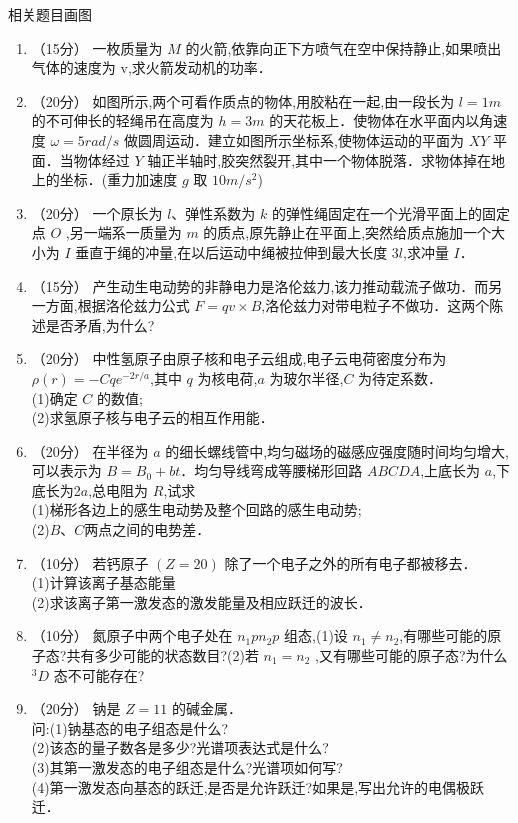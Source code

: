 
\begin{issues}
\issueTODO
相关题目画图
\end{issues}


\begin{enumerate}
\item （15分）
一枚质量为 $M$ 的火箭,依靠向正下方喷气在空中保持静止,如果喷出气体的速度为 $\mathrm v$,求火箭发动机的功率．
\item （20分）
如图所示,两个可看作质点的物体,用胶粘在一起,由一段长为 $l=1m$ 的不可伸长的轻绳吊在高度为 $h=3m$ 的天花板上．使物体在水平面内以角速度 $\omega=5rad/s$ 做圆周运动．建立如图所示坐标系,使物体运动的平面为 $XY$ 平面．当物体经过 $Y$ 轴正半轴时,胶突然裂开,其中一个物体脱落．求物体掉在地上的坐标．(重力加速度 $g$ 取 $10m/s^2$)
\item （20分）
一个原长为 $l$、弹性系数为 $k$ 的弹性绳固定在一个光滑平面上的固定点 $O$ ,另一端系一质量为 $m$ 的质点,原先静止在平面上,突然给质点施加一个大小为 $I$ 垂直于绳的冲量,在以后运动中绳被拉伸到最大长度 3$l$,求冲量 $I$．
\item （15分）
产生动生电动势的非静电力是洛伦兹力,该力推动载流子做功．而另一方面,根据洛伦兹力公式 $F=qv\times B$,洛伦兹力对带电粒子不做功．这两个陈述是否矛盾,为什么?
\item （20分）
中性氢原子由原子核和电子云组成,电子云电荷密度分布为 $\rho(r)=-Cqe^{-2r/a}$,其中 $q$ 为核电荷,$a$ 为玻尔半径,$C$ 为待定系数．\\
(1)确定 $C$ 的数值;\\
(2)求氢原子核与电子云的相互作用能．
\item （20分）
在半径为 $a$ 的细长螺线管中,均匀磁场的磁感应强度随时间均匀增大,可以表示为 $B=B_0+bt$．均匀导线弯成等腰梯形回路 $ABCDA$,上底长为 $a$,下底长为2$a$,总电阻为 $R$,试求\\
(1)梯形各边上的感生电动势及整个回路的感生电动势;\\
(2)$B$、$C$两点之间的电势差．
\item （10分）
若钙原子 $(Z=20)$ 除了一个电子之外的所有电子都被移去．\\
(1)计算该离子基态能量\\
(2)求该离子第一激发态的激发能量及相应跃迁的波长．
\item （10分）
氮原子中两个电子处在 $n_{1}pn_{2}p$ 组态,(1)设 $n_1\neq n_2$,有哪些可能的原子态?共有多少可能的状态数目?(2)若 $n_1=n_2$ ,又有哪些可能的原子态?为什么 $^{3}D$ 态不可能存在?
\item （20分） 
钠是 $Z=11$ 的碱金属．\\问:(1)钠基态的电子组态是什么?\\(2)该态的量子数各是多少?光谱项表达式是什么?\\(3)其第一激发态的电子组态是什么?光谱项如何写?\\(4)第一激发态向基态的跃迁,是否是允许跃迁?如果是,写出允许的电偶极跃迁．
\end{enumerate}